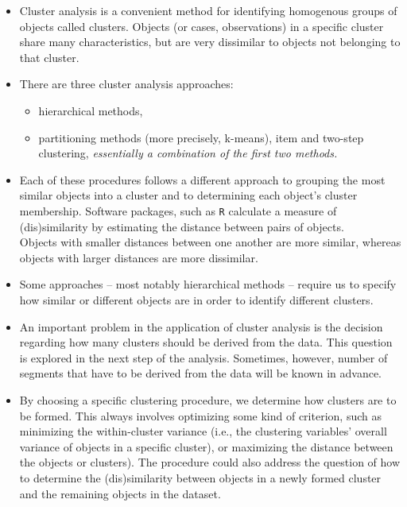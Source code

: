 \begin{itemize}
\item Cluster analysis is a convenient method for identifying homogenous groups of
objects called clusters. Objects (or cases, observations) in a specific cluster share
many characteristics, but are very dissimilar to objects not belonging to that cluster.
\item  There are three cluster analysis approaches: 
\begin{itemize}
  \item hierarchical methods,
  \item partitioning methods (more precisely, k-means), 
  item and two-step clustering,
\textit{essentially a combination of the first two methods.}
\end{itemize}
\item Each of these procedures
follows a different approach to grouping the most similar objects into a cluster and
to determining each object’s cluster membership. Software packages, such as \texttt{R} calculate a measure
of (dis)similarity by estimating the distance between pairs of objects. \\ Objects with
smaller distances between one another are more similar, whereas objects with larger
distances are more dissimilar.
\item Some approaches – most notably hierarchical methods – require us to specify how similar or different objects
    are in order to identify different clusters. 
\item An important problem in the application of cluster analysis is the decision
regarding how many clusters should be derived from the data. This question is
explored in the next step of the analysis. Sometimes, however,
number of segments that have to be derived from the data will be known in advance.
\item
By choosing a specific clustering procedure, we determine how clusters are to be
formed. This always involves optimizing some kind of criterion, such as minimizing
the within-cluster variance (i.e., the clustering variables’ overall variance of
objects in a specific cluster), or maximizing the distance between the objects or
clusters). The procedure could also address the question of how to determine the
(dis)similarity between objects in a newly formed cluster and the remaining objects
in the dataset.
\end{itemize}
\newpage
